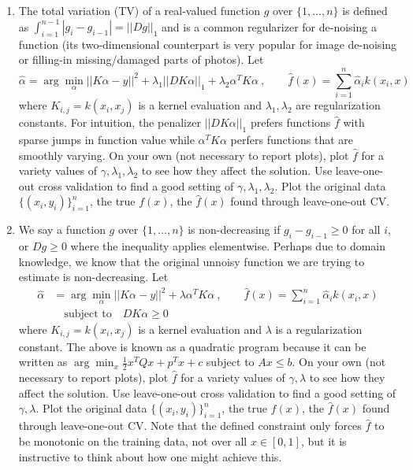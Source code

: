 \documentclass{article}
\newcommand{\1}{\mathbf{1}}
\begin{document}
\begin{enumerate}
  \item The total variation (TV) of a real-valued function $g$ over $\{1,\dots,n\}$ is defined as $\int_{i=1}^{n-1} |g_i - g_{i-1}| = || D g||_1$ and is a common regularizer for de-noising a function (its two-dimensional counterpart is very popular for image de-noising or filling-in missing/damaged parts of photos).   
  Let
\[
  \widehat{\alpha} = \arg\min_\alpha ||K\alpha - y||^2 + \lambda_1 ||D K \alpha||_1  + \lambda_2 \alpha^T K \alpha \ , \quad \quad \widehat{f}(x)=\sum_{i=1}^n \widehat{\alpha}_i k(x_i,x) 
\]
where $K_{i,j} = k(x_i,x_j)$ is a kernel evaluation and $\lambda_1, \lambda_2$ are regularization constants.
For intuition, the penalizer $||D K \alpha||_1$ prefers functions $\widehat{f}$ with sparse jumps in function value while $\alpha^T K \alpha$ perfers functions that are smoothly varying. 
On your own (not necessary to report plots), plot $\widehat{f}$ for a variety values of $\gamma, \lambda_1, \lambda_2$ to see how they affect the solution.
Use leave-one-out cross validation to find a good setting of $\gamma, \lambda_1, \lambda_2$. 
Plot the original data $\{(x_i,y_i)\}_{i=1}^n$, the true $f(x)$, the $\widehat{f}(x)$ found through leave-one-out CV.
\item We say a function $g$ over $\{1,\dots,n\}$ is non-decreasing if $g_i - g_{i-1} \geq 0$ for all $i$, or $D g \geq 0$ where the inequality applies elementwise.
Perhaps due to domain knowledge, we know that the original unnoisy function we are trying to estimate is non-decreasing. 
Let
\begin{align*}
  \widehat{\alpha} &= \arg\min_\alpha ||K\alpha - y||^2  + \lambda \alpha^T K \alpha \ , \quad \quad \widehat{f}(x)=\sum_{i=1}^n \widehat{\alpha}_i k(x_i,x) \\
  & \quad \text{subject to} \quad D K \alpha \geq 0
\end{align*}
where $K_{i,j} = k(x_i,x_j)$ is a kernel evaluation and $\lambda$ is a regularization constant.
The above is known as a quadratic program because it can be written as $\arg\min_x \frac{1}{2} x^T Q x + p^T x +c$ subject to $Ax \leq b$.
On your own (not necessary to report plots), plot $\widehat{f}$ for a variety values of $\gamma, \lambda$ to see how they affect the solution.
Use leave-one-out cross validation to find a good setting of $\gamma, \lambda$. 
Plot the original data $\{(x_i,y_i)\}_{i=1}^n$, the true $f(x)$, the $\widehat{f}(x)$ found through leave-one-out CV.
Note that the defined constraint only forces $\widehat{f}$ to be monotonic on the training data, not over all $x \in [0,1]$, but it is instructive to think about how one might achieve this.
\end{enumerate}
\end{document}
